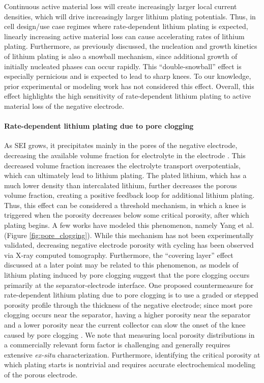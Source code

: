 \documentclass[journal=jpclcd,manuscript=article]{achemso}
\begin{document}
Continuous active material loss will create increasingly larger local current densities, which will drive increasingly larger lithium plating potentials. Thus, in cell design/use case regimes where rate-dependent lithium plating is expected, linearly increasing active material loss can cause accelerating rates of lithium plating. Furthermore, as previously discussed, the nucleation and growth kinetics of lithium plating is also a snowball mechanism, since additional growth of initially nucleated phases can occur rapidly. This ``double-snowball'' effect is especially pernicious and is expected to lead to sharp knees. To our knowledge, prior experimental or modeling work has not considered this effect. Overall, this effect highlights the high sensitivity of rate-dependent lithium plating to active material loss of the negative electrode.

\paragraph{Rate-dependent lithium plating due to pore clogging}
As SEI grows, it precipitates mainly in the pores of the negative electrode, decreasing the available volume fraction for electrolyte in the electrode \cite{sikha_effect_2004}. This decreased volume fraction increases the electrolyte transport overpotentials, which can ultimately lead to lithium plating. The plated lithium, which has a much lower density than intercalated lithium\cite{yang_modeling_2017}, further decreases the porous volume fraction, creating a positive feedback loop for additional lithium plating\cite{yang_modeling_2017}.
Thus, this effect can be considered a threshold mechanism, in which a knee is triggered when the porosity decreases below some critical porosity, after which plating begins.
A few works have modeled this phenomenon\cite{yang_modeling_2017, muller_model-based_2019, keil_electrochemical_2020}, namely Yang et al.\cite{yang_modeling_2017} (Figure \ref{fig:pore_clogging}).
While this mechanism has not been experimentally validated, decreasing negative electrode porosity with cycling has been observed via X-ray computed tomography.\cite{frisco_understanding_2016, rahe_nanoscale_2019} Furthermore, the ``covering layer'' effect discussed at a later point may be related to this phenomenon, as models of lithium plating induced by pore clogging suggest that the pore clogging occurs primarily at the separator-electrode interface.\cite{yang_modeling_2017}
One proposed countermeasure for rate-dependent lithium plating due to pore clogging is to use a graded or stepped porosity profile through the thickness of the negative electrode; since most pore clogging occurs near the separator, having a higher porosity near the separator and a lower porosity near the current collector can slow the onset of the knee caused by pore clogging \cite{muller_model-based_2019}.
We note that measuring local porosity distributions in a commercially relevant form factor is challenging and generally requires extensive \textit{ex-situ} characterization. Furthermore, identifying the critical porosity at which plating starts is nontrivial and requires accurate electrochemical modeling of the porous electrode.
\end{document}
